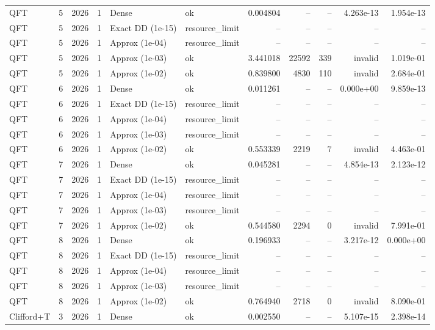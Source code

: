 \begin{tabular}{lrrrllrrrrr}
QFT & 5 & 2026 & 1 & Dense & ok & 0.004804 & -- & -- & 4.263e-13 & 1.954e-13 \\
QFT & 5 & 2026 & 1 & Exact DD (1e-15) & resource\_limit & -- & -- & -- & -- & -- \\
QFT & 5 & 2026 & 1 & Approx (1e-04) & resource\_limit & -- & -- & -- & -- & -- \\
QFT & 5 & 2026 & 1 & Approx (1e-03) & ok & 3.441018 & 22592 & 339 & invalid & 1.019e-01 \\
QFT & 5 & 2026 & 1 & Approx (1e-02) & ok & 0.839800 & 4830 & 110 & invalid & 2.684e-01 \\
QFT & 6 & 2026 & 1 & Dense & ok & 0.011261 & -- & -- & 0.000e+00 & 9.859e-13 \\
QFT & 6 & 2026 & 1 & Exact DD (1e-15) & resource\_limit & -- & -- & -- & -- & -- \\
QFT & 6 & 2026 & 1 & Approx (1e-04) & resource\_limit & -- & -- & -- & -- & -- \\
QFT & 6 & 2026 & 1 & Approx (1e-03) & resource\_limit & -- & -- & -- & -- & -- \\
QFT & 6 & 2026 & 1 & Approx (1e-02) & ok & 0.553339 & 2219 & 7 & invalid & 4.463e-01 \\
QFT & 7 & 2026 & 1 & Dense & ok & 0.045281 & -- & -- & 4.854e-13 & 2.123e-12 \\
QFT & 7 & 2026 & 1 & Exact DD (1e-15) & resource\_limit & -- & -- & -- & -- & -- \\
QFT & 7 & 2026 & 1 & Approx (1e-04) & resource\_limit & -- & -- & -- & -- & -- \\
QFT & 7 & 2026 & 1 & Approx (1e-03) & resource\_limit & -- & -- & -- & -- & -- \\
QFT & 7 & 2026 & 1 & Approx (1e-02) & ok & 0.544580 & 2294 & 0 & invalid & 7.991e-01 \\
QFT & 8 & 2026 & 1 & Dense & ok & 0.196933 & -- & -- & 3.217e-12 & 0.000e+00 \\
QFT & 8 & 2026 & 1 & Exact DD (1e-15) & resource\_limit & -- & -- & -- & -- & -- \\
QFT & 8 & 2026 & 1 & Approx (1e-04) & resource\_limit & -- & -- & -- & -- & -- \\
QFT & 8 & 2026 & 1 & Approx (1e-03) & resource\_limit & -- & -- & -- & -- & -- \\
QFT & 8 & 2026 & 1 & Approx (1e-02) & ok & 0.764940 & 2718 & 0 & invalid & 8.090e-01 \\
Clifford+T & 3 & 2026 & 1 & Dense & ok & 0.002550 & -- & -- & 5.107e-15 & 2.398e-14 \\

\end{tabular}
